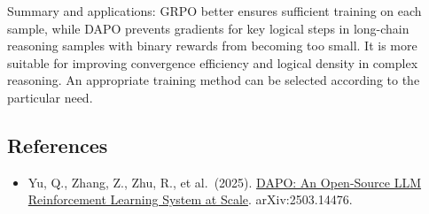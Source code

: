 Summary and applications: GRPO better ensures sufficient training on each sample, while DAPO prevents gradients for key logical steps in long-chain reasoning samples with binary rewards from becoming too small. It is more suitable for improving convergence efficiency and logical density in complex reasoning. An appropriate training method can be selected according to the particular need.

\FloatBarrier
{}
\hypertarget{references-109}{%
\subsection{References}\label{references-109}}

\vspace{0.25em}
\begin{itemize}
\tightlist
\item
  Yu, Q., Zhang, Z., Zhu, R., et al.~(2025). \href{https://arxiv.org/abs/2503.14476}{DAPO: An Open-Source LLM Reinforcement Learning System at Scale}. arXiv:2503.14476.
\end{itemize}

\clearpage
